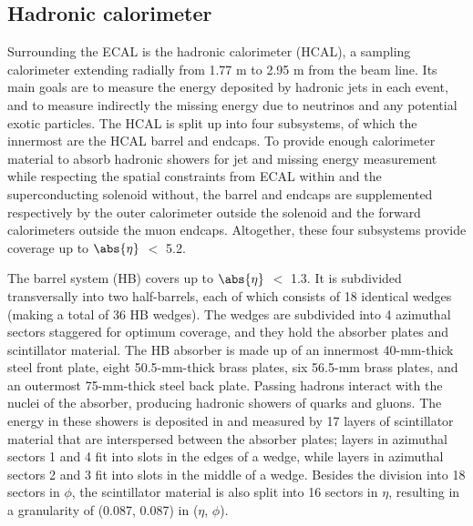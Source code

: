 \subsection{Hadronic calorimeter\label{sec:cms-hcal}}

Surrounding the ECAL is the hadronic calorimeter (HCAL), a sampling calorimeter extending radially from 1.77 m to 2.95 m from the beam line. Its main goals are to measure the energy deposited by hadronic jets in each event, and to measure indirectly the missing energy due to neutrinos and any potential exotic particles. The HCAL is split up into four subsystems, of which the innermost are the HCAL barrel and endcaps. To provide enough calorimeter material to absorb hadronic showers for jet and missing energy measurement while respecting the spatial constraints from ECAL within and the superconducting solenoid without, the barrel and endcaps are supplemented respectively by the outer calorimeter outside the solenoid and the forward calorimeters outside the muon endcaps. Altogether, these four subsystems provide coverage up to $\abs{\eta}$ $<$ 5.2.

The barrel system (HB) covers up to $\abs{\eta}$ $<$ 1.3. It is subdivided transversally into two half-barrels, each of which consists of 18 identical wedges (making a total of 36 HB wedges). The wedges are subdivided into 4 azimuthal sectors staggered for optimum coverage, and they hold the absorber plates and scintillator material. The HB absorber is made up of an innermost 40-mm-thick steel front plate, eight 50.5-mm-thick brass plates, six 56.5-mm brass plates, and an outermost 75-mm-thick steel back plate. Passing hadrons interact with the nuclei of the absorber, producing hadronic showers of quarks and gluons. The energy in these showers is deposited in and measured by 17 layers of scintillator material that are interspersed between the absorber plates; layers in azimuthal sectors 1 and 4 fit into slots in the edges of a wedge, while layers in azimuthal sectors 2 and 3 fit into slots in the middle of a wedge. Besides the division into 18 sectors in $\phi$, the scintillator material is also split into 16 sectors in $\eta$, resulting in a granularity of (0.087, 0.087) in ($\eta$, $\phi$).


